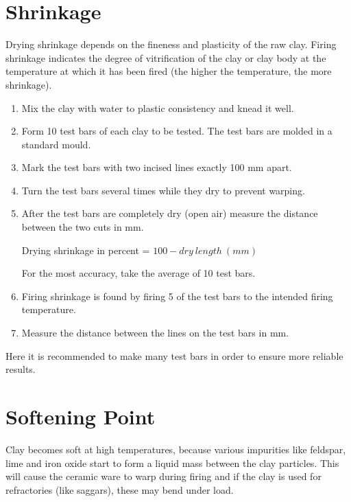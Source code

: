\section{Shrinkage}
Drying shrinkage depends on the fineness and plasticity of the raw clay. Firing 
shrinkage indicates the degree of vitrification of the clay or clay body at the 
temperature at which it has been fired (the higher the temperature, the more 
shrinkage).
\begin{enumerate}
\item Mix the clay with water to plastic consistency and knead it well.
\item Form 10 test bars of each clay to be tested. The test bars are molded in 
a standard mould.
\item Mark the test bars with two incised lines exactly 100 mm apart.
\item Turn the test bars several times while they dry to prevent warping.
\item After the test bars are completely dry (open air) measure the distance 
between the two cuts in mm.

Drying shrinkage in percent = $100 - dry~length~(mm)$

For the most accuracy, take the average of 10 test bars.
\item Firing shrinkage is found by firing 5 of the test bars to the intended 
firing temperature.
\item Measure the distance between the lines on the test bars in mm.
\end{enumerate}
Here it is recommended to make many test bars in order to ensure more reliable 
results.
\section{Softening Point}
Clay becomes soft at high temperatures, because various impurities like 
feldspar, lime and iron oxide start to form a liquid mass between the clay 
particles. This will cause the ceramic ware to warp during firing and if the 
clay is used for refractories (like saggars), these may bend under load.

